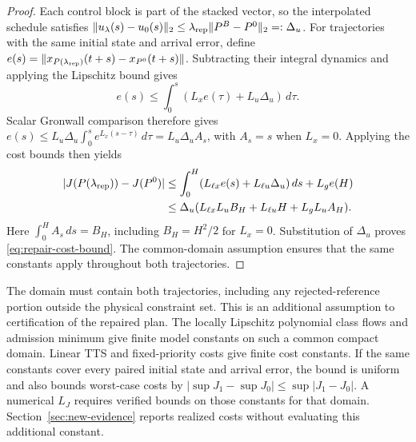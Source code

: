 \documentclass[preprint,12pt]{elsarticle}
\theoremstyle{definition}
\theoremstyle{plain}
\theoremstyle{definition}
\theoremstyle{plain}
\begin{document}
\begin{proof}
Each control block is part of the stacked vector, so the interpolated
schedule satisfies
$\|u_\lambda(s)-u_0(s)\|_2\le
\lambda_{\rm rep}\|P^B-P^0\|_2=:\Delta_u$.
For trajectories with the same initial state and arrival error, define
$e(s)=\|x_{P(\lambda_{\rm rep})}(t+s)-x_{P^0}(t+s)\|$.
Subtracting their integral dynamics and applying the Lipschitz bound gives
\[
 e(s)\le\int_0^s(L_xe(\tau)+L_u\Delta_u)\,d\tau.
\]
Scalar Gronwall comparison therefore gives
$e(s)\le L_u\Delta_u\int_0^s e^{L_x(s-\tau)}\,d\tau=L_u\Delta_u A_s$,
with $A_s=s$ when $L_x=0$. Applying the cost bounds then yields
\[
\begin{aligned}
 |J(P(\lambda_{\rm rep}))-J(P^0)|
 &\le\int_0^H(L_{\ell x}e(s)+L_{\ell u}\Delta_u)\,ds+L_ge(H)\\
 &\le\Delta_u(L_{\ell x}L_uB_H+L_{\ell u}H+L_gL_uA_H).
\end{aligned}
\]
Here $\int_0^H A_s\,ds=B_H$, including $B_H=H^2/2$ for $L_x=0$.
Substitution of $\Delta_u$ proves \eqref{eq:repair-cost-bound}.
The common-domain assumption ensures that the same constants apply
throughout both trajectories.
\end{proof}

The domain must contain both trajectories, including any rejected-reference
portion outside the physical constraint set. This is an additional
assumption to certification of the repaired plan. The locally Lipschitz
polynomial class flows and admission minimum give finite model constants
on such a common compact domain. Linear TTS and fixed-priority costs give
finite cost constants. If the same constants cover every paired initial
state and arrival error, the bound is uniform and also bounds worst-case costs
by $|\sup J_1-\sup J_0|\le\sup|J_1-J_0|$. A numerical $L_J$ requires
verified bounds on those constants for that domain. Section~\ref{sec:new-evidence} reports realized costs without
evaluating this additional constant.


\setlength{\bibsep}{0pt}

\end{document}
